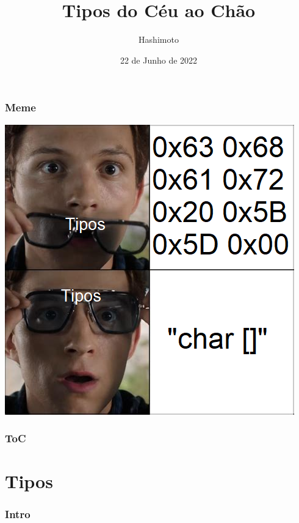 \documentclass{beamer}
\title{Tipos do Céu ao Chão}
\author{Hashimoto}
\date{22 de Junho de 2022}
\begin{document}
\begin{frame}
    \titlepage
\end{frame}

\begin{frame}
    \frametitle{Meme}
    \includegraphics[height=.85\textheight,angle=0]{char_meme.png}
    \centering
\end{frame}

\begin{frame}
    \frametitle{ToC}
    \tableofcontents[hideallsubsections]
\end{frame}

\section{Tipos}
\begin{frame}
    \frametitle{Intro}
\end{frame}
\end{document}
